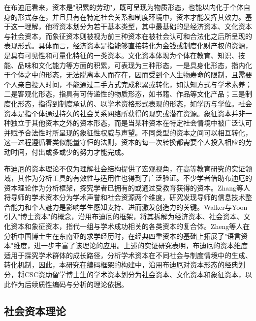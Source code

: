 在布迪厄看来，资本是"积累的劳动"，既可呈现为物质形态，也能以内化于个体自身的形式存在，并且只有在特定社会关系和制度环境中，资本才能发挥其效力。基于这一理解，他将资本划分为若干基本类型，其中最基础的是经济资本、文化资本与社会资本，而象征资本则被视为前三种资本在被社会认可和合法化之后所呈现的表现形式。具体而言，经济资本是指能够直接转化为金钱或制度化财产权的资源，是具有可见性和可量化特征的一类资本。文化资本体现为个体在教育、知识、技能、品味和文化能力等方面的积累，可表现为三种形态，一是具身化形态，指内化于个体之中的形态，无法脱离本人而存在，因而受到个人生物寿命的限制，且需要个人亲自投入时间，不能通过二手方式完成积累或转化，如认知方式与学术素养；二是客观化形态，指具有可传递性的物质形态，如书籍、作品等文化产品；三是制度化形态，指得到制度承认的、以学术资格形式表现的形态，如学历与学位。社会资本是指个体通过持久的社会关系网络所获得的现实或潜在资源。象征资本并非一种独立于其他资本之外的资本形态，而是当某种资本在特定社会情境中被广泛认可并赋予合法性时所呈现的象征性权威与声望\cite{bourdieu1986}。不同类型的资本之间可以相互转化，这一过程遵循着类似能量守恒的法则，资本的每一次转换都需要个人投入相应的劳动时间，付出或多或少的努力才能完成。

布迪厄的资本理论不仅为理解社会结构提供了宏观视角，在高等教育研究的实证领域，其作为分析工具的有效性与适用性也得到了广泛验证。不少学者借助布迪厄的资本理论作为分析框架，探究学者已拥有的或通过受教育获得的资本。Zhang等人将导师的学术资本分为学术声誉和社会资源两个维度，研究发现导师的信息技术整合能力和个人魅力是影响学生感知支持、进而激发创造力的关键\cite{zhang2022}。Walker与Yoon引入"博士资本"的概念，沿用布迪厄的框架，将其拆解为经济资本、社会资本、文化资本和象征资本，指代一组与学术成功相关的各类资本的复合体\cite{walker2017}。Zheng等人在分析中国博士生在东南亚的求学经历时，在经典四重资本的基础上拓展了"语言资本"维度，进一步丰富了该理论的应用\cite{zheng2025}。上述的实证研究表明，布迪厄的资本维度适用于探究学术群体的成长路径，分析学术资本在不同社会与制度情境中的生成、转化机制，因此，本研究在编码框架的构建中，沿用布迪厄对资本形态的经典划分，将CSC资助留学博士生的学术资本划分为社会资本、文化资本和象征资本，以此作为后续质性编码与分析的理论依据。

\subsection{社会资本理论}

